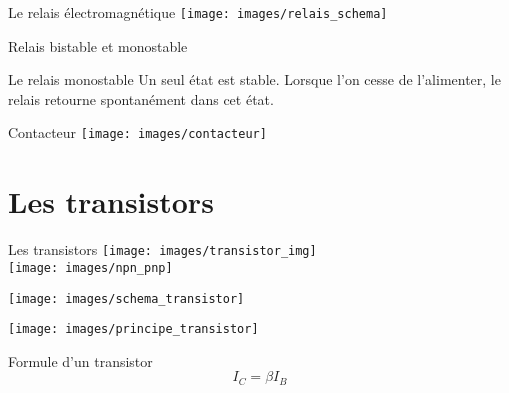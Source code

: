 \documentclass{beamer}
\begin{document}
\begin{frame}{Le relais électromagnétique}
  \centering
  \texttt{[image: images/relais\_schema]}
\end{frame}

\begin{frame}{Relais bistable et monostable}
  \begin{block}{Le relais monostable}
    Un seul état est stable. Lorsque l'on cesse de l'alimenter, le relais retourne spontanément dans cet état.
  \end{block}
\end{frame}

\begin{frame}{Contacteur}
  \texttt{[image: images/contacteur]}
\end{frame}

\section{Les transistors}

\begin{frame}{Les transistors}
  \centering
  \texttt{[image: images/transistor\_img]}
  \\
  \texttt{[image: images/npn\_pnp]}
\end{frame}

\begin{frame}{}
  \centering
  \texttt{[image: images/schema\_transistor]}
\end{frame}

\begin{frame}{}
  \centering
  \texttt{[image: images/principe\_transistor]}
  \begin{alertblock}{Formule d'un transistor}
    $$I_C = \beta I_B$$
  \end{alertblock}
\end{frame}
\end{document}
